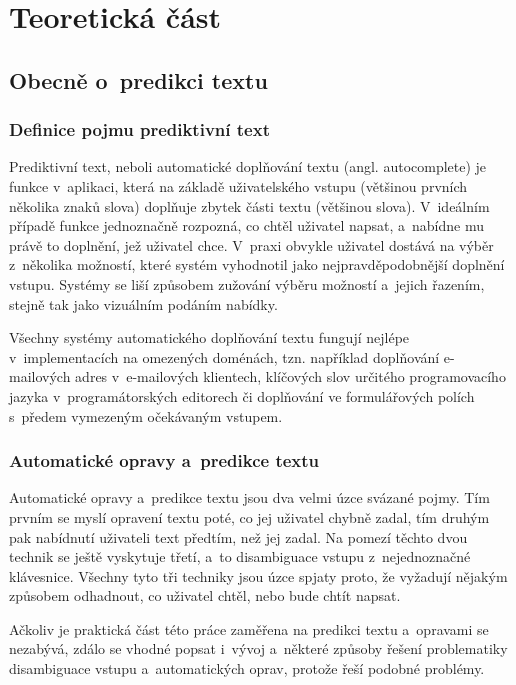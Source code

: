 \documentclass[a4paper,11pt,openany]{book} %
\begin{document}
\part{Teoretická část}
\pagestyle{fancy}

\chapter{Obecně o~predikci textu}

\section{Definice pojmu prediktivní text}

Prediktivní text, neboli automatické doplňování textu (angl. autocomplete) je funkce v~aplikaci, která na základě uživatelského vstupu (většinou prvních několika znaků slova) doplňuje zbytek části textu (většinou slova). V~ideálním případě funkce jednoznačně rozpozná, co chtěl uživatel napsat, a~nabídne mu právě to doplnění, jež uživatel chce. V~praxi obvykle uživatel dostává na výběr z~několika možností, které systém vyhodnotil jako nejpravděpodobnější doplnění vstupu. Systémy se liší způsobem zužování výběru možností a~jejich řazením, stejně tak jako vizuálním podáním nabídky.

Všechny systémy automatického doplňování textu fungují nejlépe v~implementacích na omezených doménách, tzn. například doplňování e-mailových adres v~e-mailových klientech, klíčových slov určitého programovacího jazyka v~programátorských editorech či doplňování ve formulářových polích s~předem vymezeným očekávaným vstupem. 

\section{Automatické opravy a~predikce textu}

Automatické opravy a~predikce textu jsou dva velmi úzce svázané pojmy. Tím prvním se myslí opravení textu poté, co jej uživatel chybně zadal, tím druhým pak nabídnutí uživateli text předtím, než jej zadal. Na pomezí těchto dvou technik se ještě vyskytuje třetí, a~to disambiguace vstupu z~nejednoznačné klávesnice. Všechny tyto tři techniky jsou úzce spjaty proto, že vyžadují nějakým způsobem odhadnout, co uživatel chtěl, nebo bude chtít napsat.

Ačkoliv je praktická část této práce zaměřena na predikci textu a~opravami se nezabývá, zdálo se vhodné popsat i~vývoj a~některé způsoby řešení problematiky disambiguace vstupu a~automatických oprav, protože řeší podobné problémy.
\end{document}
